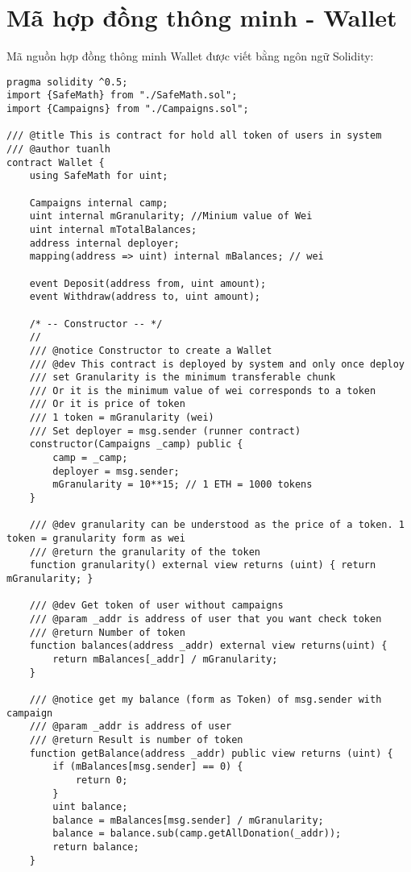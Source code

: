 \documentclass[../main-report.tex]{subfiles}
\begin{document}
\chapter{Mã hợp đồng thông minh - Wallet}
Mã nguồn hợp đồng thông minh Wallet được viết bằng ngôn ngữ Solidity:

\begin{lstlisting}
pragma solidity ^0.5;
import {SafeMath} from "./SafeMath.sol";
import {Campaigns} from "./Campaigns.sol";

/// @title This is contract for hold all token of users in system
/// @author tuanlh
contract Wallet {
    using SafeMath for uint;

    Campaigns internal camp;
    uint internal mGranularity; //Minium value of Wei
    uint internal mTotalBalances;
    address internal deployer;
    mapping(address => uint) internal mBalances; // wei

    event Deposit(address from, uint amount);
    event Withdraw(address to, uint amount);

    /* -- Constructor -- */
    //
    /// @notice Constructor to create a Wallet
    /// @dev This contract is deployed by system and only once deploy
    /// set Granularity is the minimum transferable chunk
    /// Or it is the minimum value of wei corresponds to a token
    /// Or it is price of token
    /// 1 token = mGranularity (wei)
    /// Set deployer = msg.sender (runner contract)
    constructor(Campaigns _camp) public {
        camp = _camp;
        deployer = msg.sender;
        mGranularity = 10**15; // 1 ETH = 1000 tokens
    }

    /// @dev granularity can be understood as the price of a token. 1 token = granularity form as wei
    /// @return the granularity of the token
    function granularity() external view returns (uint) { return mGranularity; }

    /// @dev Get token of user without campaigns
    /// @param _addr is address of user that you want check token
    /// @return Number of token
    function balances(address _addr) external view returns(uint) {
        return mBalances[_addr] / mGranularity;
    }

    /// @notice get my balance (form as Token) of msg.sender with campaign
    /// @param _addr is address of user
    /// @return Result is number of token
    function getBalance(address _addr) public view returns (uint) {
        if (mBalances[msg.sender] == 0) {
            return 0;
        }
        uint balance;
        balance = mBalances[msg.sender] / mGranularity;
        balance = balance.sub(camp.getAllDonation(_addr));
        return balance;
    }


\end{lstlisting}
\end{document}
